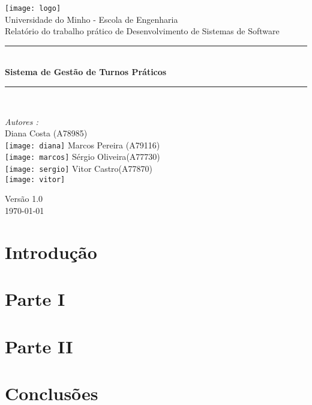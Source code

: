 \documentclass[a4paper]{article}
\begin{document}
\begin{titlepage}
\begin{center}


\texttt{[image: logo]}\\[0.5cm]

{\large Universidade do Minho - Escola de Engenharia}\\[0.5cm]

{\large Relatório do trabalho prático de Desenvolvimento de Sistemas de Software}\\[0.5cm]

\rule{\linewidth}{0.5mm} \\[0.4cm]
{ \huge \bfseries Sistema de Gestão de Turnos Práticos \\[0.4cm] }
\rule{\linewidth}{0.5mm} \\[1.5cm]

\noindent
\begin{minipage}{0.4\textwidth}
  \begin{flushleft} \large
    \emph{Autores :}\\
    Diana Costa \textsc{(A78985)}\\
    \texttt{[image: diana]}\break
    Marcos Pereira \textsc{(A79116)}\\
    \texttt{[image: marcos]}\break
    Sérgio Oliveira\textsc{(A77730)}\\
    \texttt{[image: sergio]}\break
    Vitor Castro\textsc{(A77870)}\\
    \texttt{[image: vitor]}\break
  \end{flushleft}
\end{minipage}%
\vfill

{\large Versão 1.0 \\ \today}

\end{center}
\end{titlepage}




\begin{abstract}

\hspace{3mm}
\end{abstract}

\pagebreak
\tableofcontents

\pagebreak
\section{Introdução}
\label{sec:1}

\pagebreak
\section{Parte I}
\label{sec:2}

\hspace{3mm}


  

\pagebreak
\clearpage
\section{Parte II}
\label{sec:3}


\pagebreak
\section{Conclusões}
\label{sec:4}

\hspace{3mm}
\end{document}

